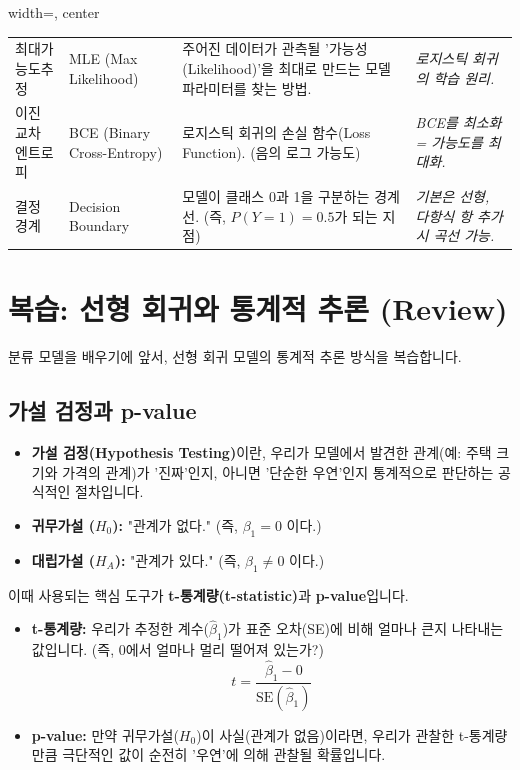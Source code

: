 \documentclass[11pt,a4paper]{book}
\theoremstyle{definition}
\begin{document}
\begin{table}[h!]
\begin{adjustbox}{width=\textwidth, center}
\begin{tabular}{@{}llll@{}}
    최대가능도추정 & MLE (Max Likelihood) & 주어진 데이터가 관측될 '가능성(Likelihood)'을 최대로 만드는 모델 파라미터를 찾는 방법. & \textit{로지스틱 회귀의 학습 원리.} \\
    이진 교차 엔트로피 & BCE (Binary Cross-Entropy) & 로지스틱 회귀의 손실 함수(Loss Function). (음의 로그 가능도) & \textit{BCE를 최소화 = 가능도를 최대화.} \\
    결정 경계 & Decision Boundary & 모델이 클래스 0과 1을 구분하는 경계선. (즉, $P(Y=1)=0.5$가 되는 지점) & \textit{기본은 선형, 다항식 항 추가 시 곡선 가능.} \\
    \bottomrule
  \end{tabular}
  \end{adjustbox}
\end{table}


\section{복습: 선형 회귀와 통계적 추론 (Review)}

분류 모델을 배우기에 앞서, 선형 회귀 모델의 통계적 추론 방식을 복습합니다.

\subsection{가설 검정과 p-value}

\begin{itemize}
    \item \textbf{가설 검정(Hypothesis Testing)}이란, 우리가 모델에서 발견한 관계(예: 주택 크기와 가격의 관계)가 '진짜'인지, 아니면 '단순한 우연'인지 통계적으로 판단하는 공식적인 절차입니다.
    \item \textbf{귀무가설 ($H_0$):} "관계가 없다." (즉, $\beta_1 = 0$ 이다.)
    \item \textbf{대립가설 ($H_A$):} "관계가 있다." (즉, $\beta_1 \neq 0$ 이다.)
\end{itemize}

이때 사용되는 핵심 도구가 \textbf{t-통계량(t-statistic)}과 \textbf{p-value}입니다.

\begin{itemize}
    \item \textbf{t-통계량:} 우리가 추정한 계수($\hat{\beta}_1$)가 표준 오차(SE)에 비해 얼마나 큰지 나타내는 값입니다. (즉, 0에서 얼마나 멀리 떨어져 있는가?)
    $$ t = \frac{\hat{\beta}_1 - 0}{\text{SE}(\hat{\beta}_1)} $$
    \item \textbf{p-value:} 만약 귀무가설($H_0$)이 사실(관계가 없음)이라면, 우리가 관찰한 t-통계량만큼 극단적인 값이 순전히 '우연'에 의해 관찰될 확률입니다.
\end{itemize}
\end{document}
